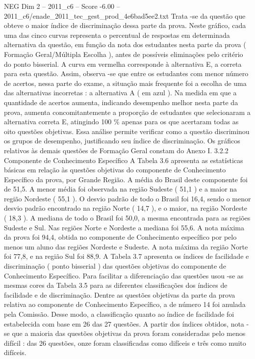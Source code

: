 \begin{textsample}{NEG Dim 2 – 2011\_c6 – Score -6.00 – 2011\_c6/enade\_2011\_tec\_gest\_prod\_4e6bad5ee2.txt}
Trata -se da questão que obteve o maior índice de discriminação dessa parte da prova.
Neste gráfico, cada uma das cinco curvas representa o percentual de respostas em determinada alternativa da questão, em função da nota dos estudantes nesta parte da prova ( Formação Geral/Múltipla Escolha ), antes de possíveis eliminações pelo critério do ponto bisserial.
A curva em vermelha corresponde à alternativa E, a correta para esta questão.
Assim, observa -se que entre os estudantes com menor número de acertos, nessa parte do exame, a situação mais frequente foi a escolha de uma das alternativas incorretas : a alternativa A ( em azul ).
Na medida em que a quantidade de acertos aumenta, indicando desempenho melhor nesta parte da prova, aumenta concomitantemente a proporção de estudantes que selecionaram a alternativa correta E, atingindo 100 \% apenas para os que acertaram todas as oito questões objetivas.
Essa análise permite verificar como a questão discriminou os grupos de desempenho, justificando seu índice de discriminação.
Os gráficos relativos às demais questões de Formação Geral constam do Anexo I. 3.2.2 Componente de Conhecimento Específico A Tabela 3.6 apresenta as estatísticas básicas em relação às questões objetivas do componente de Conhecimento Específico da prova, por Grande Região.
A média do Brasil deste componente foi de 51,5.
A menor média foi observada na região Sudeste ( 51,1 ) e a maior na região Nordeste ( 55,1 ).
O desvio padrão de todo o Brasil foi 16,4, sendo o menor desvio padrão encontrado na região Norte ( 14,7 ), e o maior, na região Nordeste ( 18,3 ).
A mediana de todo o Brasil foi 50,0, a mesma encontrada para as regiões Sudeste e Sul.
Nas regiões Norte e Nordeste a mediana foi 55,6.
A nota máxima da prova foi 94,4, obtida no componente de Conhecimento específico por pelo menos um aluno das regiões Nordeste e Sudeste.
A nota máxima da região Norte foi 77,8, e na região Sul foi 88,9.
A Tabela 3.7 apresenta os índices de facilidade e discriminação ( ponto bisserial ) das questões objetivas do componente de Conhecimento Específico.
Para facilitar a diferenciação das questões usou -se as mesmas cores da Tabela 3.5 para as diferentes classificações dos índices de facilidade e de discriminação.
Dentre as questões objetivas da parte da prova relativa ao componente de Conhecimento Específico, a de número 14 foi anulada pela Comissão.
Desse modo, a classificação quanto ao índice de facilidade foi estabelecida com base em 26 das 27 questões.
A partir dos índices obtidos, nota -se que a maioria das questões objetivas da prova foram consideradas pelo menos difícil : das 26 questões, onze foram classificadas como difíceis e três como muito difíceis.

\end{textsample}
